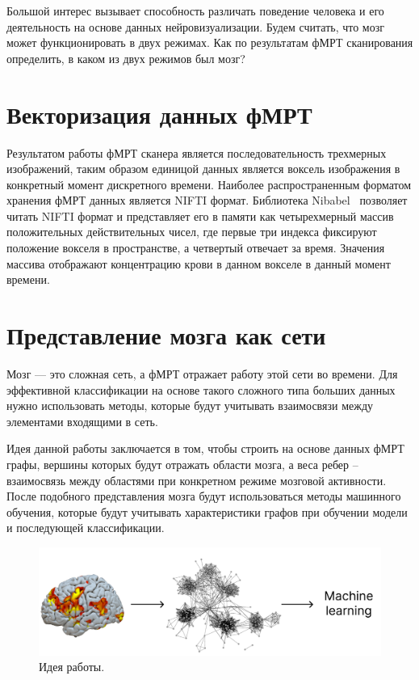 \documentclass[specialist,
substylefile = spbu_report.rtx,
subf,href,colorlinks=true, 12pt]{disser}
\begin{document}
			Большой интерес вызывает способность различать поведение человека и его деятельность на основе данных нейровизуализации. Будем считать, что мозг может функционировать в двух режимах. Как по результатам фМРТ сканирования определить, в каком из двух режимов был мозг? 
			
		\section{Векторизация данных фМРТ}
			Результатом работы фМРТ сканера является последовательность трехмерных изображений, таким образом единицой данных является воксель изображения в конкретный момент дискретного времени. Наиболее распространенным форматом хранения фМРТ данных является NIFTI формат. Библиотека Nibabel~\cite{BrettMatthew2023} позволяет читать NIFTI формат и представляет его в памяти как четырехмерный массив положительных действительных чисел, где первые три индекса фиксируют положение вокселя в пространстве, а четвертый отвечает за время. Значения массива отображают концентрацию крови в данном вокселе в данный момент времени.
			
		\section{Представление мозга как сети}
			Мозг --- это сложная сеть, а фМРТ отражает работу этой сети во времени. Для эффективной классификации на основе такого сложного типа больших данных нужно использовать методы, которые будут учитывать взаимосвязи между элементами входящими в сеть.
			
			Идея данной работы заключается в том, чтобы строить на основе данных фМРТ графы, вершины которых будут отражать области мозга, а веса ребер – взаимосвязь между областями при конкретном режиме мозговой активности. После подобного представления мозга будут использоваться методы машинного обучения, которые будут учитывать характеристики графов при обучении модели и последующей классификации.
			
			\begin{figure}[h]
				\centering
				\includegraphics[width=12cm]{../images/fmri_graph_ml_1.pdf}
				\caption{Идея работы.} 
				\label{fg:1}
			\end{figure}
			
\end{document}
